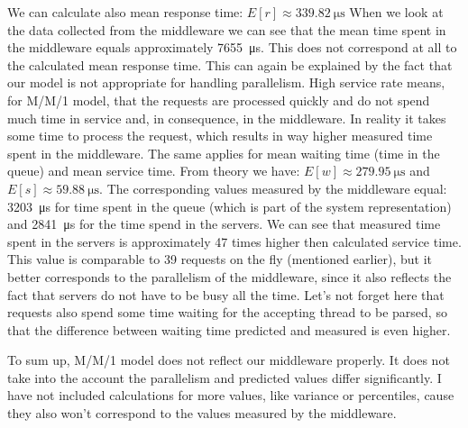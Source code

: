 \documentclass[11pt]{article}
\begin{document}
We can calculate also mean response time:
$E[r] 
\approx \SI{339.82}{\micro\second}$
When we look at the data collected from the middleware we can see that the mean time spent in the middleware equals approximately \SI{7655}{\micro\second}. This does not correspond at all to the calculated mean response time. This can again be explained by the fact that our model is not appropriate for handling parallelism. High service rate means, for M/M/1 model, that the requests are processed quickly and do not spend much time in service and, in consequence, in the middleware. In reality it takes some time to process the request, which results in way higher measured time spent in the middleware. The same applies for mean waiting time (time in the queue) and mean service time. From theory we have:
$E[w] 
\approx \SI{279.95}{\micro\second}$ and
$E[s] 
\approx \SI{59.88}{\micro\second}$.
The corresponding values measured by the middleware equal: \SI{3203}{\micro\second} for time spent in the queue (which is part of the system representation) and \SI{2841}{\micro\second} for the time spend in the servers. We can see that measured time spent in the servers is approximately 47 times higher then calculated service time. This value is comparable to 39 requests on the fly (mentioned earlier), but it better corresponds to the parallelism of the middleware, since it also reflects the fact that servers do not have to be busy all the time. Let's not forget here that requests also spend some time waiting for the accepting thread to be parsed, so that the difference between waiting time predicted and measured is even higher.

To sum up, M/M/1 model does not reflect our middleware properly. It does not take into the account the parallelism and predicted values differ significantly. I have not included calculations for more values, like variance or percentiles, cause they also won't correspond to the values measured by the middleware.

\end{document}
